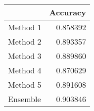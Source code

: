 \begin{tabular}{lr}
\toprule
{} &  Accuracy \\
\midrule
Method 1 &  0.858392 \\
Method 2 &  0.893357 \\
Method 3 &  0.889860 \\
Method 4 &  0.870629 \\
Method 5 &  0.891608 \\
Ensemble &  0.903846 \\
\bottomrule
\end{tabular}
